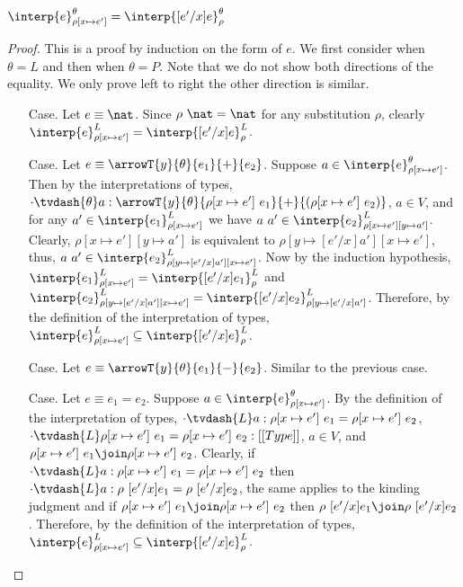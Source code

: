 \begin{lemma}
  \label{lemma:movable_subs}
  $\interp{e}^\theta_{\rho[x \mapsto e']} = \interp{[e'/x]e}^\theta_\rho$
\end{lemma}
\begin{proof}
  This is a proof by induction on the form of $e$.  We first consider when $\theta = L$ and
  then when $\theta = P$.  Note that we do not show both directions of the equality.  We only
  prove left to right the other direction is similar.
  
  \begin{itemize}
  \item[Case.] Let $e \equiv \nat$.  
    Since $\rho\ \nat = \nat$ for any substitution $\rho$, clearly
    $\interp{e}^L_{\rho[x \mapsto e']} = \interp{[e'/x]e}^L_\rho$.

  \item[Case.] Let $e \equiv \arrowT{y}{\theta}{e_1}{+}{e_2}$.  Suppose 
    $a \in \interp{e}^\theta_{\rho[x \mapsto e']}$.  Then by the interpretations of types,
    $\cdot \tvdash{\theta} a:
    \arrowT{y}{\theta}{\rho[x \mapsto e']\ e_1}{+}{(\rho[x \mapsto e']\ e_2)}$, 
    $a \in V$,
    and for any $a' \in \interp{e_1}^L_{\rho[x \mapsto e']}$ we have 
    $a\ a' \in \interp{e_2}^L_{\rho[x \mapsto e'][y \mapsto a']}$.  Clearly, 
    $\rho[x \mapsto e'][y \mapsto a']$ is equivalent to
    $\rho[y \mapsto [e'/x]a'][x \mapsto e']$, thus, 
    $a\ a' \in \interp{e_2}^L_{\rho[y \mapsto [e'/x]a'][x \mapsto e']}$.  Now by the induction
    hypothesis, $\interp{e_1}^L_{\rho[x \mapsto e']} = \interp{[e'/x]e_1}^L_{\rho}$ and
    $\interp{e_2}^L_{\rho[y \mapsto [e'/x]a'][x \mapsto e']} = 
    \interp{[e'/x]e_2}^L_{\rho[y \mapsto [e'/x]a']}$.  Therefore, by the definition of the 
    interpretation of types, $\interp{e}^L_{\rho[x \mapsto e']} \subseteq \interp{[e'/x]e}^L_\rho$.

  \item[Case.]  Let $e \equiv \arrowT{y}{\theta}{e_1}{-}{e_2}$.  Similar to the previous case.

  \item[Case.] Let $e \equiv e_1 = e_2$.  Suppose $a \in \interp{e}^\theta_{\rho[x \mapsto e']}$.
    By the definition of the interpretation of types, 
    $\cdot \tvdash{L} a:\rho[x \mapsto e']\ e_1 = \rho[x \mapsto e']\ e_2$, 
    $\cdot \tvdash{L} \rho[x \mapsto e']\ e_1 = \rho[x \mapsto e']\ e_2:[[Type]]$,
    $a \in V$, 
    and $\rho[x \mapsto e']\ e_1 \join \rho[x \mapsto e']\ e_2$.  Clearly, if 
    $\cdot \tvdash{L} a:\rho[x \mapsto e']\ e_1 = \rho[x \mapsto e']\ e_2$ then
    $\cdot \tvdash{L} a:\rho\ [e'/x]e_1 = \rho\ [e'/x]e_2$, the same applies to the kinding
    judgment and
    if $\rho[x \mapsto e']\ e_1 \join \rho[x \mapsto e']\ e_2$ then
    $\rho\ [e'/x]e_1 \join \rho\ [e'/x]e_2$.  Therefore, by the definition of the 
    interpretation of types, 
    $\interp{e}^L_{\rho[x \mapsto e']} \subseteq \interp{[e'/x]e}^L_\rho$.
  \end{itemize}
  

\end{proof}
